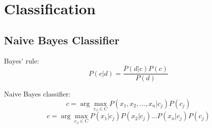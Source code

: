 \chapter{Classification}

\section{Naive Bayes Classifier}

\noindent Bayes' rule:
$$P(c|d) = \frac{P(d|c) P(c)}{P(d)}$$

\noindent Naive Bayes classifier:
$$c=\arg\!\max_{c_J \in C} P(x_1, x_2, \ldots,x_n|c_j)P(c_j)$$
$$c=\arg\!\max_{c_J \in C} P(x_1|c_j)P(x_2|c_j)\ldots P(x_n|c_j)P(c_j)$$
